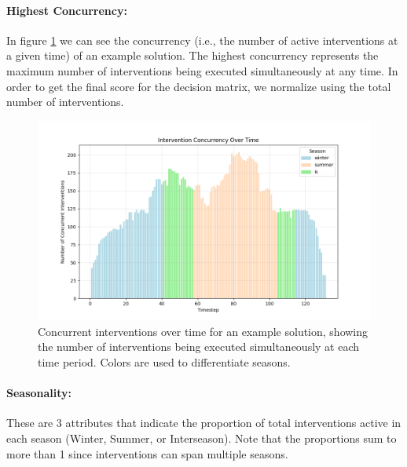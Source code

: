 \paragraph{Highest Concurrency:} In figure \ref{fig:concurrency} we can see the concurrency (i.e., the number of active interventions at a given time) of an example solution. The highest concurrency represents the maximum number of interventions being executed simultaneously at any time. In order to get the final score for the decision matrix, we normalize using the total number of interventions.

\begin{figure}[ht]
    \centering
    \includegraphics[width=\textwidth]{ch3/figures/Concurrency.png}
    \caption{Concurrent interventions over time for an example solution, showing the number of interventions being executed simultaneously at each time period. Colors are used to differentiate seasons.}
    \label{fig:concurrency}
\end{figure}







\paragraph{Seasonality:} These are 3 attributes that indicate the proportion of total interventions active in each season (Winter, Summer, or Interseason). Note that the proportions sum to more than 1 since interventions can span multiple seasons.